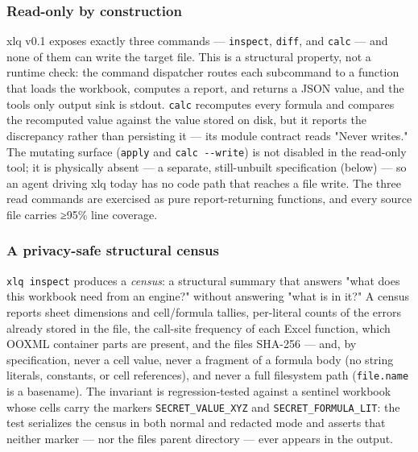 \documentclass[
]{article}
\newcounter{none} %
\begin{document}
\subsubsection{Read-only by
construction}\label{read-only-by-construction}

xlq v0.1 exposes exactly three commands --- \texttt{inspect},
\texttt{diff}, and \texttt{calc} --- and none of them can write the
target file. This is a structural property, not a runtime check: the
command dispatcher routes each subcommand to a function that loads the
workbook, computes a report, and returns a JSON value, and the
tool\textquotesingle s only output sink is stdout. \texttt{calc}
recomputes every formula and compares the recomputed value against the
value stored on disk, but it reports the discrepancy rather than
persisting it --- its module contract reads "Never writes." The mutating
surface (\texttt{apply} and \texttt{calc\ -\/-write}) is not disabled in
the read-only tool; it is physically absent --- a separate,
still-unbuilt specification (below) --- so an agent driving xlq today
has no code path that reaches a file write. The three read commands are
exercised as pure report-returning functions, and every source file
carries ≥95\% line coverage.

\subsubsection{A privacy-safe structural
census}\label{a-privacy-safe-structural-census}

\texttt{xlq\ inspect} produces a \emph{census}: a structural summary
that answers "what does this workbook need from an engine?" without
answering "what is in it?" A census reports sheet dimensions and
cell/formula tallies, per-literal counts of the errors already stored in
the file, the call-site frequency of each Excel function, which OOXML
container parts are present, and the file\textquotesingle s SHA-256 ---
and, by specification, never a cell value, never a fragment of a formula
body (no string literals, constants, or cell references), and never a
full filesystem path (\texttt{file.name} is a basename). The invariant
is regression-tested against a sentinel workbook whose cells carry the
markers \texttt{SECRET\_VALUE\_XYZ} and \texttt{SECRET\_FORMULA\_LIT}:
the test serializes the census in both normal and redacted mode and
asserts that neither marker --- nor the file\textquotesingle s parent
directory --- ever appears in the output.
\end{document}

